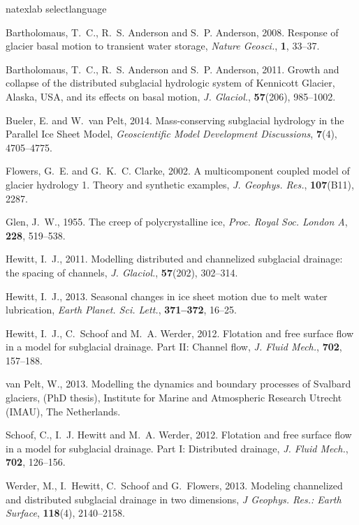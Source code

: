 \documentclass[twocolumn]{igs}
\begin{document}
\begin{thebibliography}{11}
\expandafter\ifx\csname natexlab\endcsname\relax\def\natexlab#1{#1}\fi
\expandafter\ifx\csname selectlanguage\endcsname\relax
  \def\selectlanguage#1{\relax}\fi

Bartholomaus, T.~C., R.~S. Anderson and S.~P. Anderson, 2008. Response of
  glacier basal motion to transient water storage, {\em Nature Geosci.\/}, {\bf
  1}, 33--37.

Bartholomaus, T.~C., R.~S. Anderson and S.~P. Anderson, 2011. Growth and
  collapse of the distributed subglacial hydrologic system of {K}ennicott
  {G}lacier, {A}laska, {USA}, and its effects on basal motion, {\em J.
  Glaciol.\/}, {\bf 57}(206), 985--1002.

Bueler, E. and W.~van Pelt, 2014. Mass-conserving subglacial hydrology in the
  {Parallel Ice Sheet Model}, {\em Geoscientific Model Development
  Discussions\/}, {\bf 7}(4), 4705--4775.

Flowers, G.~E. and G.~K.~C. Clarke, 2002. A multicomponent coupled model of
  glacier hydrology 1. {T}heory and synthetic examples, {\em J. Geophys.
  Res.\/}, {\bf 107}(B11), 2287.

Glen, J.~W., 1955. The creep of polycrystalline ice, {\em Proc. Royal Soc.
  London A\/}, {\bf 228}, 519--538.

Hewitt, I.~J., 2011. Modelling distributed and channelized subglacial drainage:
  the spacing of channels, {\em J. Glaciol.\/}, {\bf 57}(202), 302--314.

Hewitt, I.~J., 2013. Seasonal changes in ice sheet motion due to melt water
  lubrication, {\em Earth Planet. Sci. Lett.\/}, {\bf 371--372}, 16--25.

Hewitt, I.~J., C.~Schoof and M.~A. Werder, 2012. Flotation and free surface
  flow in a model for subglacial drainage. {P}art {II}: {C}hannel flow, {\em J.
  Fluid Mech.\/}, {\bf 702}, 157--188.

van Pelt, W., 2013. Modelling the dynamics and boundary processes of {S}valbard
  glaciers, (PhD thesis), Institute for Marine and Atmospheric Research Utrecht
  (IMAU), The Netherlands.

Schoof, C., I.~J. Hewitt and M.~A. Werder, 2012. Flotation and free surface
  flow in a model for subglacial drainage. {P}art {I}: {D}istributed drainage,
  {\em J. Fluid Mech.\/}, {\bf 702}, 126--156.

Werder, M., I.~Hewitt, C.~Schoof and G.~Flowers, 2013. Modeling channelized and
  distributed subglacial drainage in two dimensions, {\em J Geophys. Res.:
  Earth Surface\/}, {\bf 118}(4), 2140--2158.

\end{thebibliography}
\end{document}
